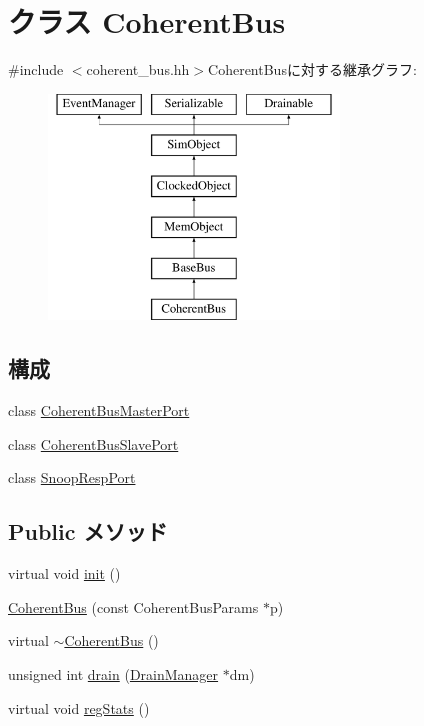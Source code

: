 \hypertarget{classCoherentBus}{
\section{クラス CoherentBus}
\label{classCoherentBus}
}


{\ttfamily \#include $<$coherent\_\-bus.hh$>$}CoherentBusに対する継承グラフ:\begin{figure}[H]
\begin{center}
\leavevmode
\includegraphics[height=6cm]{classCoherentBus}
\end{center}
\end{figure}
\subsection*{構成}
\begin{DoxyCompactItemize}
\item 
class \hyperlink{classCoherentBus_1_1CoherentBusMasterPort}{CoherentBusMasterPort}
\item 
class \hyperlink{classCoherentBus_1_1CoherentBusSlavePort}{CoherentBusSlavePort}
\item 
class \hyperlink{classCoherentBus_1_1SnoopRespPort}{SnoopRespPort}
\end{DoxyCompactItemize}
\subsection*{Public メソッド}
\begin{DoxyCompactItemize}
\item 
virtual void \hyperlink{classCoherentBus_a02fd73d861ef2e4aabb38c0c9ff82947}{init} ()
\item 
\hyperlink{classCoherentBus_a0ca3474701c095c96854cb430f4f6bba}{CoherentBus} (const CoherentBusParams $\ast$p)
\item 
virtual \hyperlink{classCoherentBus_a9f68bdf0f3ed90b32cf54e32f4bfc0b2}{$\sim$CoherentBus} ()
\item 
unsigned int \hyperlink{classCoherentBus_aa8a18d230dba7a674ac8a0b4f35bc36a}{drain} (\hyperlink{classDrainManager}{DrainManager} $\ast$dm)
\item 
virtual void \hyperlink{classCoherentBus_a4dc637449366fcdfc4e764cdf12d9b11}{regStats} ()
\end{DoxyCompactItemize}
